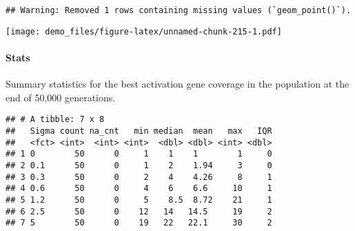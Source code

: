 \documentclass[]{book}
\newenvironment{Shaded}{\begin{snugshade}}{\end{snugshade}}
\newcommand{\DataTypeTok}[1]{\textcolor[rgb]{0.13,0.29,0.53}{#1}}
\newcommand{\KeywordTok}[1]{\textcolor[rgb]{0.13,0.29,0.53}{\textbf{#1}}}
\newcommand{\NormalTok}[1]{#1}
\newcommand{\OperatorTok}[1]{\textcolor[rgb]{0.81,0.36,0.00}{\textbf{#1}}}
\newcommand{\OtherTok}[1]{\textcolor[rgb]{0.56,0.35,0.01}{#1}}
\newcommand{\StringTok}[1]{\textcolor[rgb]{0.31,0.60,0.02}{#1}}
\let\oldparagraph\paragraph
\renewcommand{\paragraph}[1]{\oldparagraph{#1}\mbox{}}
\begin{document}
\begin{verbatim}
## Warning: Removed 1 rows containing missing values (`geom_point()`).
\end{verbatim}

\texttt{[image: demo\_files/figure-latex/unnamed-chunk-215-1.pdf]}

\hypertarget{stats-41}{%
\paragraph{Stats}\label{stats-41}}

Summary statistics for the best activation gene coverage in the population at the end of 50,000 generations.

\begin{Shaded}
\end{Shaded}

\begin{verbatim}
## # A tibble: 7 x 8
##   Sigma count na_cnt   min median  mean   max   IQR
##   <fct> <int>  <int> <int>  <dbl> <dbl> <int> <dbl>
## 1 0        50      0     1    1    1        1     0
## 2 0.1      50      0     1    2    1.94     3     0
## 3 0.3      50      0     2    4    4.26     8     1
## 4 0.6      50      0     4    6    6.6     10     1
## 5 1.2      50      0     5    8.5  8.72    21     1
## 6 2.5      50      0    12   14   14.5     19     2
## 7 5        50      0    19   22   22.1     30     2
\end{verbatim}
\end{document}
